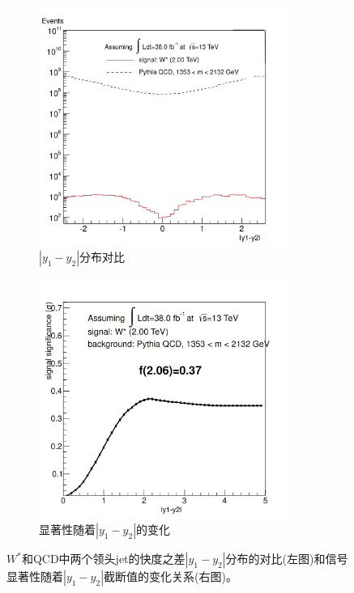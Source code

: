 \begin{figure}[htbp]
  \begin{subfigure}{.5\textwidth}
  \centering
   \includegraphics[width=0.9\textwidth]{figuresDijet/03-BenchmarkSignals/DeltaY.jpg}
   \caption{$|y_1-y_2|$分布对比}
   \label{fig:WSY1}
  \end{subfigure}
  \begin{subfigure}{.5\textwidth}
  \centering
   \includegraphics[width=0.9\textwidth]{figuresDijet/03-BenchmarkSignals/Significance.jpg}
   \caption{显著性随着$|y_1-y_2|$的变化}
   \label{fig:WSY2}
  \end{subfigure}
  \caption{$W^*$和QCD中两个领头jet的快度之差$|y_1-y_2|$分布的对比(左图)和信号显著性随着$|y_1-y_2|$截断值的变化关系(右图)。}
  \label{fig:Selection1}
\end{figure} 

